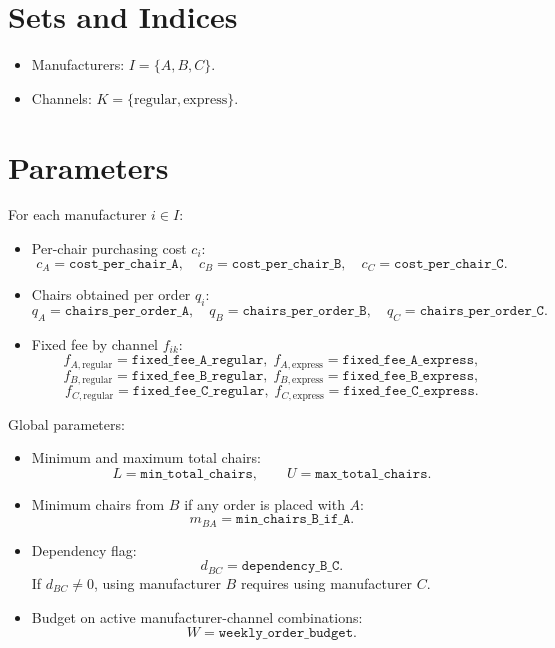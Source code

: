 \section*{Sets and Indices}

\begin{itemize}
    \item Manufacturers: $I = \{A,B,C\}$.
    \item Channels: $K = \{\mathrm{regular}, \mathrm{express}\}$.
\end{itemize}

\section*{Parameters}

For each manufacturer $i \in I$:
\begin{itemize}
    \item Per-chair purchasing cost $c_i$:
    \[
    c_A=\texttt{cost\_per\_chair\_A},\quad
    c_B=\texttt{cost\_per\_chair\_B},\quad
    c_C=\texttt{cost\_per\_chair\_C}.
    \]
    \item Chairs obtained per order $q_i$:
    \[
    q_A=\texttt{chairs\_per\_order\_A},\quad
    q_B=\texttt{chairs\_per\_order\_B},\quad
    q_C=\texttt{chairs\_per\_order\_C}.
    \]
    \item Fixed fee by channel $f_{ik}$:
    \[
    f_{A,\mathrm{regular}}=\texttt{fixed\_fee\_A\_regular},\;
    f_{A,\mathrm{express}}=\texttt{fixed\_fee\_A\_express},
    \]
    \[
    f_{B,\mathrm{regular}}=\texttt{fixed\_fee\_B\_regular},\;
    f_{B,\mathrm{express}}=\texttt{fixed\_fee\_B\_express},
    \]
    \[
    f_{C,\mathrm{regular}}=\texttt{fixed\_fee\_C\_regular},\;
    f_{C,\mathrm{express}}=\texttt{fixed\_fee\_C\_express}.
    \]
\end{itemize}

Global parameters:
\begin{itemize}
    \item Minimum and maximum total chairs:
    \[
    L=\texttt{min\_total\_chairs},\qquad U=\texttt{max\_total\_chairs}.
    \]
    \item Minimum chairs from $B$ if any order is placed with $A$:
    \[
    m_{BA}=\texttt{min\_chairs\_B\_if\_A}.
    \]
    \item Dependency flag:
    \[
    d_{BC}=\texttt{dependency\_B\_C}.
    \]
    If $d_{BC}\neq 0$, using manufacturer $B$ requires using manufacturer $C$.
    \item Budget on active manufacturer-channel combinations:
    \[
    W=\texttt{weekly\_order\_budget}.
    \]
\end{itemize}


